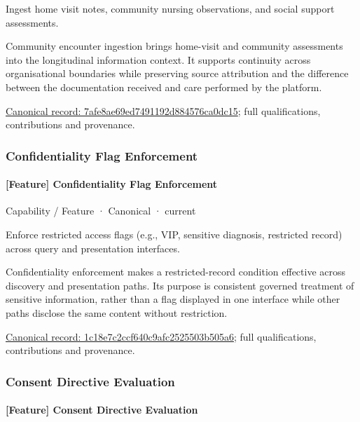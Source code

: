 Ingest home visit notes, community nursing observations, and social support assessments.



Community encounter ingestion brings home-visit and community assessments into the longitudinal information context. It supports continuity across organisational boundaries while preserving source attribution and the difference between the documentation received and care performed by the platform.


{\footnotesize \href{../../../../continuum/strategy/capability/feature/7afe8ae69ed7491192d884576ca0dc15.md}{Canonical record: 7afe8ae69ed7491192d884576ca0dc15}; full qualifications, contributions and provenance.}\par
\subsubsection{Confidentiality Flag Enforcement}

\paragraph{[Feature] Confidentiality Flag Enforcement}

\label{element:1c18e7c2ccf640c9afc2525503b505a6}
{\small Capability / Feature · Canonical · current}\par

Enforce restricted access flags (e.g., VIP, sensitive diagnosis, restricted record) across query and presentation interfaces.



Confidentiality enforcement makes a restricted-record condition effective across discovery and presentation paths. Its purpose is consistent governed treatment of sensitive information, rather than a flag displayed in one interface while other paths disclose the same content without restriction.


{\footnotesize \href{../../../../continuum/strategy/capability/feature/1c18e7c2ccf640c9afc2525503b505a6.md}{Canonical record: 1c18e7c2ccf640c9afc2525503b505a6}; full qualifications, contributions and provenance.}\par
\subsubsection{Consent Directive Evaluation}

\paragraph{[Feature] Consent Directive Evaluation}

